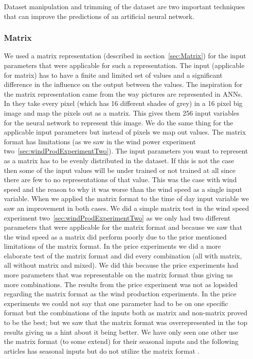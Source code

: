 Dataset manipulation and trimming of the dataset are two important techniques that can improve the predictions of an artificial neural network.
\subsubsection{Matrix}
We used a matrix representation (described in section~\ref{sec:Matrix}) for the input parameters that were applicable for such a representation. The input (applicable for matrix) has to have a finite and limited set of values and a significant difference in the influence on the output between the values. The inspiration for the matrix representation came from the way pictures are represented in ANNs. In \cite{knerr1992handwritten} they take every pixel (which has 16 different shades of grey) in a 16 pixel big image and map the pixels out as a matrix. This gives them 256 input variables for the neural network to represent this image. We do the same thing for the applicable input parameters but instead of pixels we map out values. The matrix format has limitations (as we saw in the wind power experiment two~\ref{sec:windProdExperimentTwo}). The input parameters you want to represent as a matrix has to be evenly distributed in the dataset. If this is not the case then some of the input values will be under trained or not trained at all since there are few to no representations of that value. This was the case with wind speed and the reason to why it was worse than the wind speed as a single input variable. When we applied the matrix format to the time of day input variable we saw an improvement in both cases. We did a simple matrix test in the wind speed experiment two~\ref{sec:windProdExperimentTwo} as we only had two different parameters that were applicable for the matrix format and because we saw that the wind speed as a matrix did perform poorly due to the prior mentioned limitations of the matrix format. In the price experiments we did a more elaborate test of the matrix format and did every combination (all with matrix, all without matrix and mixed). We did this because the price experiments had more parameters that was representable on the matrix format thus giving us more combinations. The results from the price experiment was not as lopsided regarding the matrix format as the wind production experiments. In the price experiments we could not say that one parameter had to be on one specific format but the combinations of the inputs both as matrix and non-matrix proved to be the best; but we saw that the matrix format was overrepresented in the top results giving us a hint about it being better. We have only seen one other \cite{crowley2005weather} use the matrix format (to some extend) for their seasonal inputs and the following articles has seasonal inputs but do not utilize the matrix format \cite{szkuta1999electricity, singhal2011electricity}.

